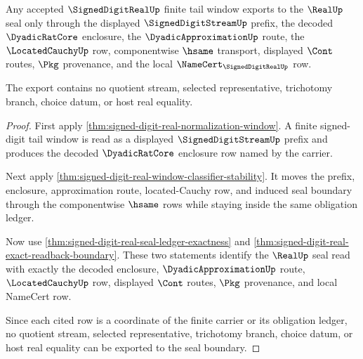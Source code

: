 \begin{theorem}
\label{thm:signed-digit-real-tail-window-export}
Any accepted $\SignedDigitRealUp$ finite tail window exports to the $\RealUp$ seal only through the displayed $\SignedDigitStreamUp$ prefix, the decoded $\DyadicRatCore$ enclosure, the $\DyadicApproximationUp$ route, the $\LocatedCauchyUp$ row, componentwise $\hsame$ transport, displayed $\Cont$ routes, $\Pkg$ provenance, and the local $\NameCert_{\SignedDigitRealUp}$ row.

The export contains no quotient stream, selected representative, trichotomy branch, choice datum, or host real equality.
\end{theorem}
\begin{proof}
First apply \autoref{thm:signed-digit-real-normalization-window}. A finite signed-digit tail window is read as a displayed $\SignedDigitStreamUp$ prefix and produces the decoded $\DyadicRatCore$ enclosure row named by the carrier.

Next apply \autoref{thm:signed-digit-real-window-classifier-stability}. It moves the prefix, enclosure, approximation route, located-Cauchy row, and induced seal boundary through the componentwise $\hsame$ rows while staying inside the same obligation ledger.

Now use \autoref{thm:signed-digit-real-seal-ledger-exactness} and \autoref{thm:signed-digit-real-exact-readback-boundary}. These two statements identify the $\RealUp$ seal read with exactly the decoded enclosure, $\DyadicApproximationUp$ route, $\LocatedCauchyUp$ row, displayed $\Cont$ routes, $\Pkg$ provenance, and local NameCert row.

Since each cited row is a coordinate of the finite carrier or its obligation ledger, no quotient stream, selected representative, trichotomy branch, choice datum, or host real equality can be exported to the seal boundary.
\end{proof}

